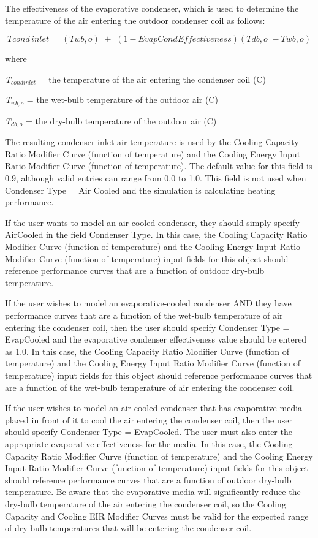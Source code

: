 The effectiveness of the evaporative condenser, which is used to determine the temperature of the air entering the outdoor condenser coil as follows:

\begin{equation}
Tcond\,inlet = \,\left( {Twb,o} \right)\,\, + \,\,\left( {1 - EvapCondEffectiveness} \right)\left( {Tdb,o\,\, - Twb,o} \right)
\end{equation}

where

\emph{T\(_{cond inlet}\)} = the temperature of the air entering the condenser coil (C)

\emph{T\(_{wb,o}\)} = the wet-bulb temperature of the outdoor air (C)

\emph{T\(_{db,o}\)} = the dry-bulb temperature of the outdoor air (C)

The resulting condenser inlet air temperature is used by the Cooling Capacity Ratio Modifier Curve (function of temperature) and the Cooling Energy Input Ratio Modifier Curve (function of temperature). The default value for this field is 0.9, although valid entries can range from 0.0 to 1.0. This field is not used when Condenser Type = Air Cooled and the simulation is calculating heating performance.

If the user wants to model an air-cooled condenser, they should simply specify AirCooled in the field Condenser Type. In this case, the Cooling Capacity Ratio Modifier Curve (function of temperature) and the Cooling Energy Input Ratio Modifier Curve (function of temperature) input fields for this object should reference performance curves that are a function of outdoor dry-bulb temperature.

If the user wishes to model an evaporative-cooled condenser AND they have performance curves that are a function of the wet-bulb temperature of air entering the condenser coil, then the user should specify Condenser Type = EvapCooled and the evaporative condenser effectiveness value should be entered as 1.0. In this case, the Cooling Capacity Ratio Modifier Curve (function of temperature) and the Cooling Energy Input Ratio Modifier Curve (function of temperature) input fields for this object should reference performance curves that are a function of the wet-bulb temperature of air entering the condenser coil.

If the user wishes to model an air-cooled condenser that has evaporative media placed in front of it to cool the air entering the condenser coil, then the user should specify Condenser Type = EvapCooled. The user must also enter the appropriate evaporative effectiveness for the media. In this case, the Cooling Capacity Ratio Modifier Curve (function of temperature) and the Cooling Energy Input Ratio Modifier Curve (function of temperature) input fields for this object should reference performance curves that are a function of outdoor dry-bulb temperature. Be aware that the evaporative media will significantly reduce the dry-bulb temperature of the air entering the condenser coil, so the Cooling Capacity and Cooling EIR Modifier Curves must be valid for the expected range of dry-bulb temperatures that will be entering the condenser coil.

